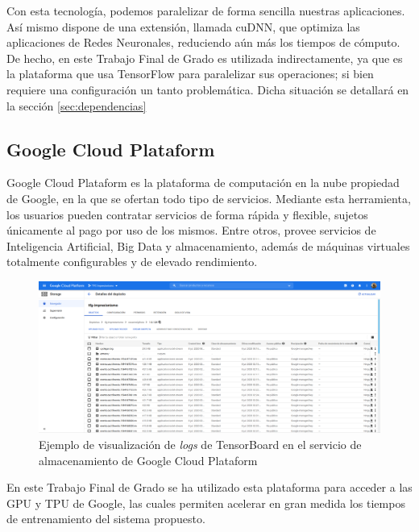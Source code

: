 \documentclass[../main.tex]{subfiles}
\begin{document}
Con esta tecnología, podemos paralelizar de forma sencilla nuestras aplicaciones. Así mismo dispone de una extensión, llamada cuDNN, que optimiza las aplicaciones de Redes Neuronales, reduciendo aún más los tiempos de cómputo. De hecho, en este Trabajo Final de Grado es utilizada indirectamente, ya que es la plataforma que usa TensorFlow para paralelizar sus operaciones; si bien requiere una configuración un tanto problemática. Dicha situación se detallará en la sección \ref{sec:dependencias}

\subsection{Google Cloud Plataform}

Google Cloud Plataform es la plataforma de computación en la nube propiedad de Google, en la que se ofertan todo tipo de servicios. Mediante esta herramienta, los usuarios pueden contratar servicios de forma rápida y flexible, sujetos únicamente al pago por uso de los mismos. Entre otros, provee servicios de Inteligencia Artificial, Big Data y almacenamiento, además de máquinas virtuales totalmente configurables y de elevado rendimiento. \newline

\begin{figure}[h!]
    \centering
    \includegraphics[width=1\textwidth]{imagenes/gcp_logs.png}
    \caption{Ejemplo de visualización de \textit{logs} de TensorBoard en el servicio de almacenamiento de Google Cloud Plataform}
    \label{fig:gcp_logs}
\end{figure}

En este Trabajo Final de Grado se ha utilizado esta plataforma para acceder a las GPU y TPU de Google, las cuales permiten acelerar en gran medida los tiempos de entrenamiento del sistema propuesto.
\end{document}
